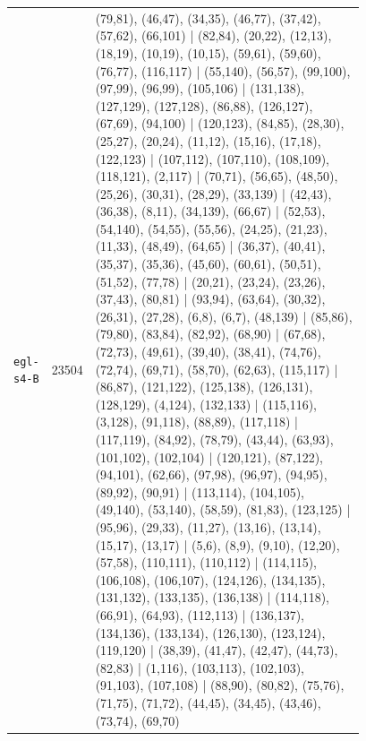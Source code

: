 \begin{landscape}
\begin{longtable}{lr>{\tiny\raggedright\arraybackslash}p{0.78\linewidth}}
\texttt{egl-s4-B} & 23504 & (79,81), (46,47), (34,35), (46,77), (37,42), (57,62), (66,101) | (82,84), (20,22), (12,13), (18,19), (10,19), (10,15), (59,61), (59,60), (76,77), (116,117) | (55,140), (56,57), (99,100), (97,99), (96,99), (105,106) | (131,138), (127,129), (127,128), (86,88), (126,127), (67,69), (94,100) | (120,123), (84,85), (28,30), (25,27), (20,24), (11,12), (15,16), (17,18), (122,123) | (107,112), (107,110), (108,109), (118,121), (2,117) | (70,71), (56,65), (48,50), (25,26), (30,31), (28,29), (33,139) | (42,43), (36,38), (8,11), (34,139), (66,67) | (52,53), (54,140), (54,55), (55,56), (24,25), (21,23), (11,33), (48,49), (64,65) | (36,37), (40,41), (35,37), (35,36), (45,60), (60,61), (50,51), (51,52), (77,78) | (20,21), (23,24), (23,26), (37,43), (80,81) | (93,94), (63,64), (30,32), (26,31), (27,28), (6,8), (6,7), (48,139) | (85,86), (79,80), (83,84), (82,92), (68,90) | (67,68), (72,73), (49,61), (39,40), (38,41), (74,76), (72,74), (69,71), (58,70), (62,63), (115,117) | (86,87), (121,122), (125,138), (126,131), (128,129), (4,124), (132,133) | (115,116), (3,128), (91,118), (88,89), (117,118) | (117,119), (84,92), (78,79), (43,44), (63,93), (101,102), (102,104) | (120,121), (87,122), (94,101), (62,66), (97,98), (96,97), (94,95), (89,92), (90,91) | (113,114), (104,105), (49,140), (53,140), (58,59), (81,83), (123,125) | (95,96), (29,33), (11,27), (13,16), (13,14), (15,17), (13,17) | (5,6), (8,9), (9,10), (12,20), (57,58), (110,111), (110,112) | (114,115), (106,108), (106,107), (124,126), (134,135), (131,132), (133,135), (136,138) | (114,118), (66,91), (64,93), (112,113) | (136,137), (134,136), (133,134), (126,130), (123,124), (119,120) | (38,39), (41,47), (42,47), (44,73), (82,83) | (1,116), (103,113), (102,103), (91,103), (107,108) | (88,90), (80,82), (75,76), (71,75), (71,72), (44,45), (34,45), (43,46), (73,74), (69,70) \\[2pt]

\end{longtable}
\end{landscape}
